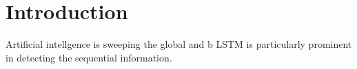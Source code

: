\section{Introduction}
Artificial intellgence is sweeping the global and b
LSTM is particularly prominent in detecting the sequential information. 
